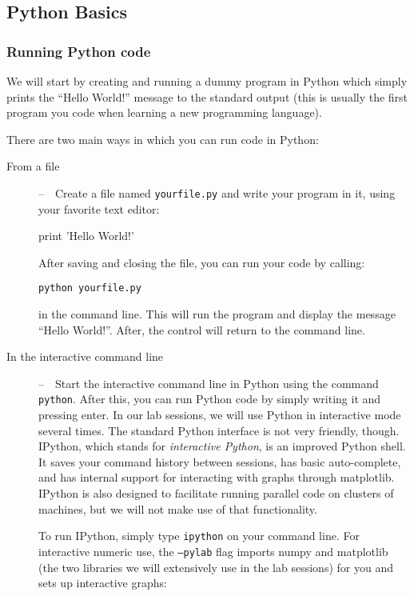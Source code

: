 \subsection{Python Basics}

\subsubsection{Running Python code}

We will start by creating and running a dummy program in Python which simply prints the ``Hello World!'' message to the standard output (this is usually the first program you code when learning a new programming language). 

There are two main ways in which you can run code in Python: 

\begin{description}
\item[From a file]--~~Create a file named \texttt{yourfile.py} and write your program in it, using your favorite text editor:

\begin{python}
print 'Hello World!'
\end{python}

After saving and closing the file, you can run your code by calling: 

\begin{verbatim}
python yourfile.py
\end{verbatim}

in the command line. This will run the program and display the message ``Hello World!''. After, the control will return to the command line.




\item[In the interactive command line]--~~Start the interactive command line in Python using the command \texttt{python}. After this, you can run Python code by simply writing it and pressing enter. In our lab sessions, we will use Python in interactive mode several times. The standard Python interface is not very friendly, though. IPython, which stands for \emph{interactive Python}, is an improved Python shell. It saves your command history between sessions, has basic auto-complete, and has internal support for interacting with graphs through matplotlib. IPython is also designed to facilitate running parallel code on clusters of machines, but we will not make use of that functionality.

To run IPython, simply type \texttt{ipython} on your command line\footnotemark{}. For interactive numeric use, the \texttt{--pylab} flag imports numpy and matplotlib (the two libraries we will extensively use in the lab sessions) for you and sets up interactive graphs:


\end{description}
